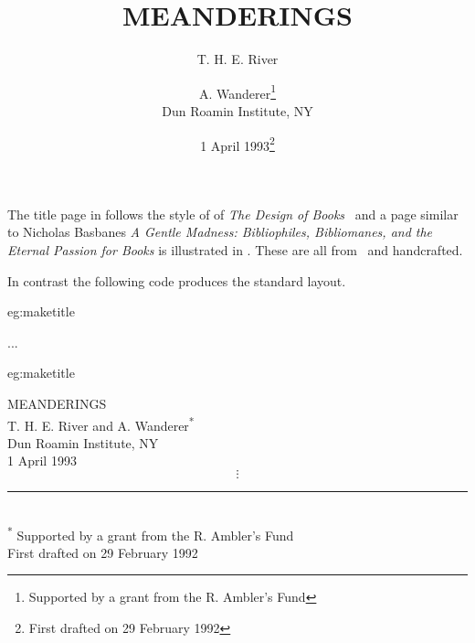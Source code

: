     The title page in  follows the style of 
of \textit{The Design of Books}~\cite{ADRIANWILSON93}
and a page similar to Nicholas Basbanes \textit{A Gentle Madness: Bibliophiles, 
Bibliomanes, and the Eternal Passion for Books} is illustrated in 
. These are all from~\cite{TITLEPAGES} and handcrafted.

In contrast the following code produces the standard \cmd{\maketitle} layout.

\begin{egsource}{eg:maketitle}
\title{MEANDERINGS}
\author{T. H. E. River \and
        A. Wanderer\thanks{Supported by a grant from the 
        R. Ambler's Fund}\\
        Dun Roamin Institute, NY}
\date{1 April 1993\thanks{First drafted on 29 February 1992}}
...
\maketitle
\end{egsource}

\begin{egresult}{eg:maketitle}
%
\begin{center}
\vspace{0.5\onelineskip}
\begin{minipage}{0.75\textwidth}
\begin{center}
{\Large MEANDERINGS} \\
\vspace*{2ex}
T. H. E. River and A. Wanderer\textsuperscript{*} \\
Dun Roamin Institute, NY \\
\vspace*{2ex}
1 April 1993\textsuperscript{\dag}
\begin{displaymath}
\vdots
\end{displaymath}
\end{center}
\begin{footnotesize}
\rule{0.3\textwidth}{0.4pt} \\
\noindent
\textsuperscript{*} Supported by a grant from the R. Ambler's Fund \\
\textsuperscript{\dag} First drafted on 29 February 1992
\end{footnotesize}
\end{minipage}
\vspace{0.75\onelineskip}
\end{center}

\end{egresult}

